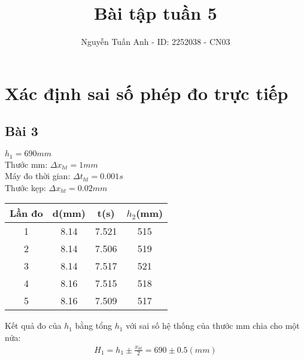 \documentclass{article}
\title{Bài tập tuần 5}
\author{Nguyễn Tuấn Anh - ID: 2252038 - CN03}
\begin{document}
\maketitle
\section*{Xác định sai số phép đo trực tiếp}
\subsection*{Bài 3}
$h_1 = 690mm$\\ 
Thước mm: $\Delta x_{ht} = 1mm$\\
Máy đo thời gian: $\Delta t_{ht} = 0.001s$\\
Thước kẹp: $\Delta x_{ht} = 0.02mm$\\
\begin{center}
    \begin{tabular}{|c|c|c|c|}
        \hline
        Lần đo & d(mm) & t(s) & $h_2$(mm) \\
        \hline
        1 & 8.14 & 7.521 & 515 \\
        \hline
        2 & 8.14 & 7.506 & 519 \\ 
        \hline
        3 & 8.14 & 7.517 & 521 \\
        \hline
        4 & 8.16 & 7.515 & 518 \\
        \hline
        5 & 8.16 & 7.509 & 517 \\
        \hline
    \end{tabular}
\end{center}
Kết quả đo của $h_1$ bằng tổng $h_1$ với sai số hệ thống của thước mm chia cho một nửa:
\begin{align*}
    H_1 = h_1 \pm \frac{x_{ht}}{2} = 690 \pm 0.5(mm)
\end{align*}
\end{document}
